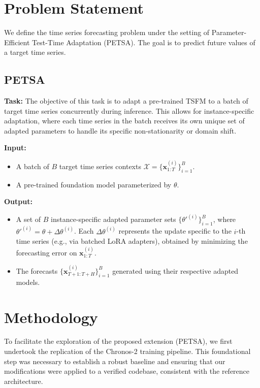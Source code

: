 \documentclass[conference]{IEEEtran}
\begin{document}
\section{Problem Statement}

We define the time series forecasting problem under the setting of Parameter-Efficient Test-Time Adaptation (PETSA). The goal is to predict future values of a target time series.

\subsection{PETSA}
\textbf{Task:} The objective of this task is to adapt a pre-trained TSFM to a batch of target time series concurrently during inference. This allows for instance-specific adaptation, where each time series in the batch receives its own unique set of adapted parameters to handle its specific non-stationarity or domain shift.

\textbf{Input:}
\begin{itemize}
    \item A batch of $B$ target time series contexts $\mathcal{X} = \{\mathbf{x}^{(i)}_{1:T}\}_{i=1}^{B}$.
    \item A pre-trained foundation model parameterized by $\theta$.
\end{itemize}

\textbf{Output:}
\begin{itemize}
    \item A set of $B$ instance-specific adapted parameter sets $\{\theta'^{(i)}\}_{i=1}^{B}$, where $\theta'^{(i)} = \theta + \Delta\theta^{(i)}$. Each $\Delta\theta^{(i)}$ represents the update specific to the $i$-th time series (e.g., via batched LoRA adapters), obtained by minimizing the forecasting error on $\mathbf{x}^{(i)}_{1:T}$.
    \item The forecasts $\{\mathbf{x}^{(i)}_{T+1:T+H}\}_{i=1}^{B}$ generated using their respective adapted models.
\end{itemize}

\section{Methodology}

To facilitate the exploration of the proposed extension (PETSA), we first undertook the replication of the Chronos-2 training pipeline. This foundational step was necessary to establish a robust baseline and ensuring that our modifications were applied to a verified codebase, consistent with the reference architecture.
\end{document}
